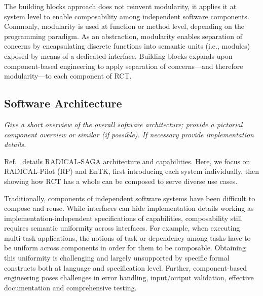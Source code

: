 \documentclass[preprint,12pt, a4paper]{elsarticle}
\begin{document}
The building blocks approach does not reinvent modularity, it applies it at
system level to enable composability among independent software components.
Commonly, modularity is used at function or method level, depending on the
programming paradigm. As an abstraction, modularity enables separation of
concerns by encapsulating discrete functions into semantic units (i.e.,
modules) exposed by means of a dedicated interface. Building blocks expands
upon component-based engineering to apply separation of concerns---and
therefore modularity---to each component of RCT\@.

\subsection{Software Architecture}\label{ssec:architecture}

{\em Give a short overview of the overall software architecture; provide a
pictorial component overview or similar (if possible). If necessary provide
implementation details.}


Ref.~\cite{merzky2015saga} details RADICAL-SAGA architecture and
capabilities. Here, we focus on RADICAL-Pilot (RP) and EnTK, first
introducing each system individually, then showing how RCT has a whole can be
composed to serve diverse use cases.

Traditionally, components of independent software systems have been difficult
to compose and reuse. While interfaces can hide implementation details
working as implementation-independent specifications of capabilities,
composability still requires semantic uniformity across interfaces. For
example, when executing multi-task applications, the notions of task or
dependency among tasks have to be uniform across components in order for them
to be composable. Obtaining this uniformity is challenging and largely
unsupported by specific formal constructs both at language and specification
level. Further, component-based engineering poses challenges in error
handling, input/output validation, effective documentation and comprehensive
testing.
\end{document}
